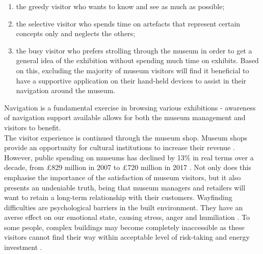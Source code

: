 \begin{enumerate}
\item the greedy visitor who wants to know and see as much as possible;
\item the selective visitor who spends time on artefacts that represent certain concepts only and neglects the others;
\item the busy visitor who prefers strolling through the museum in order to get a general idea of the exhibition without spending much time on exhibits. Based on this, excluding  the majority of museum visitors will find it beneficial to have a supportive application on their hand-held devices to assist in their navigation around the museum.
\end{enumerate}
Navigation is a fundamental exercise in browsing various exhibitions - awareness of navigation support available allows for both the museum management and visitors to benefit.\\

The visitor experience is continued through the museum shop. Museum shops provide an opportunity for cultural institutions to increase their revenue \cite{murphy}. However, public spending on museums has declined by 13\% in real terms over a decade, from £829 million in 2007 to £720 million in 2017 \cite{pickford}. Not only does this emphasise the importance of the satisfaction of museum visitors, but it also presents an undeniable truth, being that museum managers and retailers will want to
retain a long-term relationship with their customers. Wayfinding difficulties are psychological barriers in the built environment. They have an averse effect on our emotional state, causing stress, anger and humiliation \cite{Ecology}. To some people, complex buildings may become completely inaccessible as these visitors cannot find their way within acceptable level of risk-taking and energy investment \cite{Wayfinding}.\\ 

